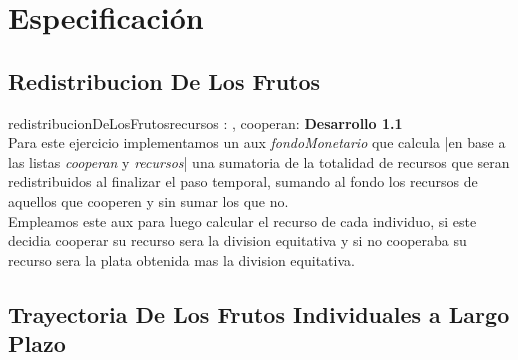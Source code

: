 \documentclass[10pt,a4paper]{article}
\begin{document}
\maketitle

\section{Especificaci\'on}
\subsection{Redistribucion De Los Frutos}

\begin{proc}{redistribucionDeLosFrutos}{\In recursos : \TLista{\ent}, \In cooperan: \TLista{\bool}}{\TLista{\ent}}
	\textbf{Desarrollo 1.1}
	\\
	Para este ejercicio implementamos un aux \textit{fondoMonetario} que calcula |en base a las listas \textit{cooperan} y \textit{recursos}| una sumatoria de la totalidad de recursos que seran redistribuidos al finalizar el paso temporal, sumando al fondo los recursos de aquellos que cooperen y sin sumar los que no.
\\ Empleamos este aux para luego calcular el recurso de cada individuo, si este decidia cooperar su recurso sera la division equitativa y si no cooperaba su recurso sera la plata obtenida mas la division equitativa.
\end{proc}







\subsection{Trayectoria De Los Frutos Individuales a Largo Plazo}
\end{document}
